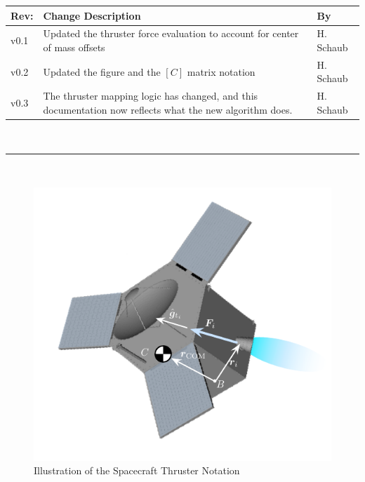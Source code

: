 \documentclass[]{BasiliskReportMemo}
\begin{document}
\makeCover


%
%
\pagestyle{empty}
{\renewcommand{\arraystretch}{1.1}
\noindent
\begin{longtable}{|p{0.5in}|p{4.5in}|p{1.14in}|}
\hline
{\bfseries Rev}: & {\bfseries Change Description} & {\bfseries By} \\
\hline
v0.1 & Updated the thruster force evaluation to account for center of mass offsets & H. Schaub \\
v0.2 & Updated the figure and the $[C]$ matrix notation & H. Schaub \\
v0.3 & The thruster mapping logic has changed, and this documentation now reflects what the new algorithm does. & H. Schaub \\
\hline

\end{longtable}
}

\newpage
\setcounter{page}{1}
\pagestyle{fancy}

\tableofcontents
~\\ \hrule ~\\

\begin{figure}[htb]
	\centerline{
	\includegraphics[]{Figures/thrusterNotation}
	}
	\caption{Illustration of the Spacecraft Thruster Notation}
	\label{fig:thruster}
\end{figure}
\end{document}
